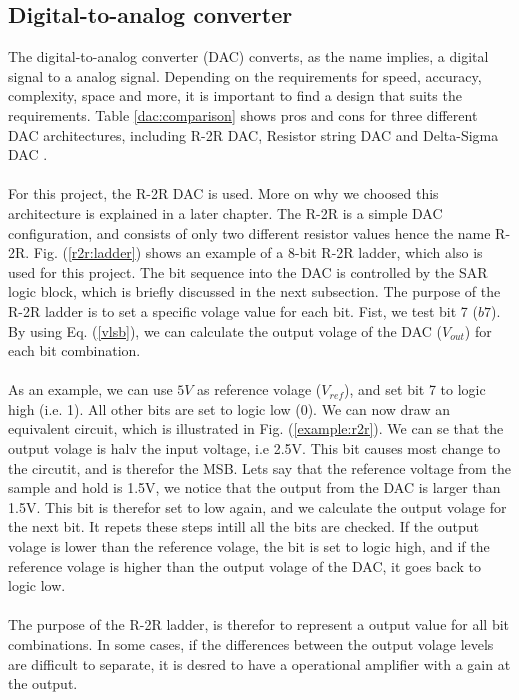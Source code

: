 \documentclass[english, 12pt, a4paper]{ifimaster}
\begin{document}
\subsection{Digital-to-analog converter}
The digital-to-analog converter (DAC) converts, as the name implies, a digital signal to a analog signal. Depending on the requirements for speed, accuracy, complexity, space and more, it is 
important to find a design that suits the requirements. Table \ref{dac:comparison} shows pros and cons for three different DAC architectures, including R-2R DAC, Resistor string DAC and 
Delta-Sigma DAC \cite{different-dac}. \\
\\
For this project, the R-2R DAC is used. More on why we choosed this architecture is explained in a later chapter. The R-2R is a simple DAC configuration, and consists of only two different 
resistor values hence the name R-2R. Fig. (\ref{r2r:ladder}) shows an example of a 8-bit R-2R ladder, which also is used for this project. The bit sequence into the DAC is controlled by the SAR logic
block, which is briefly discussed in the next subsection. The purpose of the R-2R ladder is to set a specific volage value for each bit. Fist, we test bit 7 (\(b7\)). By using Eq. (\ref{vlsb}), we 
can calculate the output volage of the DAC (\(V_{out}\)) for each bit combination.\\
\\
As an example, we can use \(5V\) as reference volage (\(V_{ref}\)), and set bit 7 to logic high (i.e. 1). All other bits are set to logic low (0). We can now draw an equivalent circuit, 
which is illustrated in Fig. (\ref{example:r2r}). We can se that the output volage is halv the input voltage, i.e 2.5V. 
This bit causes most change to the circutit, and is therefor the MSB. Lets say that the reference voltage from the sample and hold is 1.5V, we notice that the output from the DAC is larger than 1.5V.
This bit is therefor set to low again, and we calculate the output volage for the next bit. It repets these steps intill all the bits are checked. If the output volage is lower than the reference 
volage, the bit is set to logic high, and if the reference volage is higher than the output volage of the DAC, it goes back to logic low.\\
\\
The purpose of the R-2R ladder, is therefor to represent a output value for all bit combinations. In some cases, if the differences between the output volage levels are difficult to separate, 
it is desred to have a operational amplifier with a gain at the output. 
\end{document}
